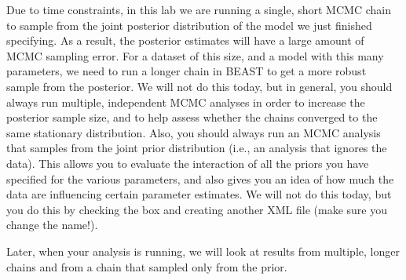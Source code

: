 {    Due to time constraints, in this lab we are running a single, short
    MCMC chain to sample from the joint posterior distribution of the model we
    just finished specifying.
    As a result, the posterior estimates will have a large amount of
    MCMC sampling error.
    For a dataset of this size, and a model with this many parameters, we need
    to run a longer chain in BEAST to get a more robust sample from the
    posterior.
    We will not do this today, but in general, you should always run multiple,
    independent MCMC analyses in order to increase the posterior sample size,
    and to help assess whether the chains converged to the same stationary
    distribution.
    Also, you should always run an MCMC analysis that samples from the joint
    prior distribution (i.e., an analysis that ignores the data).  This allows
    you to evaluate the interaction of all the priors you have specified for
    the various parameters, and also gives you an idea of how much the data are
    influencing certain parameter estimates.
    We will not do this today, but you do this by checking the  box and creating another XML file
    (make sure you change the name!).

    Later, when your analysis is running, we will look at results from multiple,
    longer chains and from a chain that sampled only from the prior.
}



